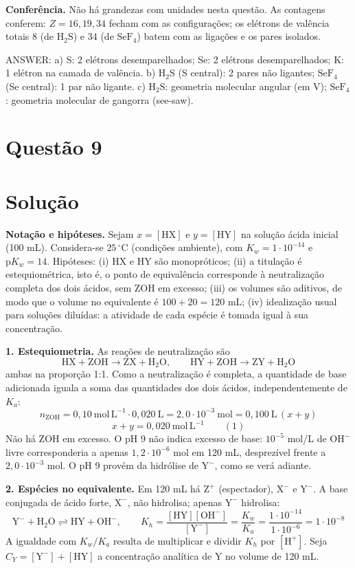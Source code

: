\documentclass{article}%
\begin{document}
\textbf{Conferência.} Não há grandezas com unidades nesta questão. As contagens conferem: $Z=16, 19, 34$ fecham com as configurações; os elétrons de valência totais $8$ (de $\mathrm{H_2S}$) e $34$ (de $\mathrm{SeF_4}$) batem com as ligações e os pares isolados.

ANSWER: a) S: 2 elétrons desemparelhados; Se: 2 elétrons desemparelhados; K: 1 elétron na camada de valência. b) $\mathrm{H_2S}$ (S central): 2 pares não ligantes; $\mathrm{SeF_4}$ (Se central): 1 par não ligante. c) $\mathrm{H_2S}$: geometria molecular angular (em V); $\mathrm{SeF_4}$: geometria molecular de gangorra (see-saw).%
\newpage%
\section*{Questão 9}

\section*{Solução}

\textbf{Notação e hipóteses.} Sejam $x=[\mathrm{HX}]$ e $y=[\mathrm{HY}]$ na solução ácida inicial (100 mL). Considera-se $25\,^\circ\mathrm{C}$ (condições ambiente), com $K_w = 1\cdot10^{-14}$ e $\mathrm{p}K_w = 14$. Hipóteses: (i) HX e HY são monopróticos; (ii) a titulação é estequiométrica, isto é, o ponto de equivalência corresponde à neutralização completa dos dois ácidos, sem ZOH em excesso; (iii) os volumes são aditivos, de modo que o volume no equivalente é $100 + 20 = 120$ mL; (iv) idealização usual para soluções diluídas: a atividade de cada espécie é tomada igual à sua concentração.

\textbf{1. Estequiometria.} As reações de neutralização são
\[
\mathrm{HX + ZOH \rightarrow ZX + H_2O}, \qquad \mathrm{HY + ZOH \rightarrow ZY + H_2O}
\]
ambas na proporção 1:1. Como a neutralização é completa, a quantidade de base adicionada iguala a soma das quantidades dos dois ácidos, independentemente de $K_a$:
\[
n_{\mathrm{ZOH}} = 0{,}10\ \mathrm{mol\,L^{-1}} \cdot 0{,}020\ \mathrm{L} = 2{,}0\cdot10^{-3}\ \mathrm{mol} = 0{,}100\ \mathrm{L}\,(x+y)
\]
\[
x + y = 0{,}020\ \mathrm{mol\,L^{-1}} \qquad (1)
\]
Não há ZOH em excesso. O pH 9 não indica excesso de base: $10^{-5}$ mol/L de $\mathrm{OH^-}$ livre corresponderia a apenas $1{,}2\cdot10^{-6}$ mol em 120 mL, desprezível frente a $2{,}0\cdot10^{-3}$ mol. O pH 9 provém da hidrólise de $\mathrm{Y^-}$, como se verá adiante.

\textbf{2. Espécies no equivalente.} Em 120 mL há $\mathrm{Z^+}$ (espectador), $\mathrm{X^-}$ e $\mathrm{Y^-}$. A base conjugada de ácido forte, $\mathrm{X^-}$, não hidrolisa; apenas $\mathrm{Y^-}$ hidrolisa:
\[
\mathrm{Y^- + H_2O \rightleftharpoons HY + OH^-}, \qquad K_h = \frac{[\mathrm{HY}][\mathrm{OH^-}]}{[\mathrm{Y^-}]} = \frac{K_w}{K_a} = \frac{1\cdot10^{-14}}{1\cdot10^{-6}} = 1\cdot10^{-8}
\]
A igualdade com $K_w/K_a$ resulta de multiplicar e dividir $K_h$ por $[\mathrm{H^+}]$. Seja $C_Y = [\mathrm{Y^-}] + [\mathrm{HY}]$ a concentração analítica de Y no volume de 120 mL.
\end{document}
